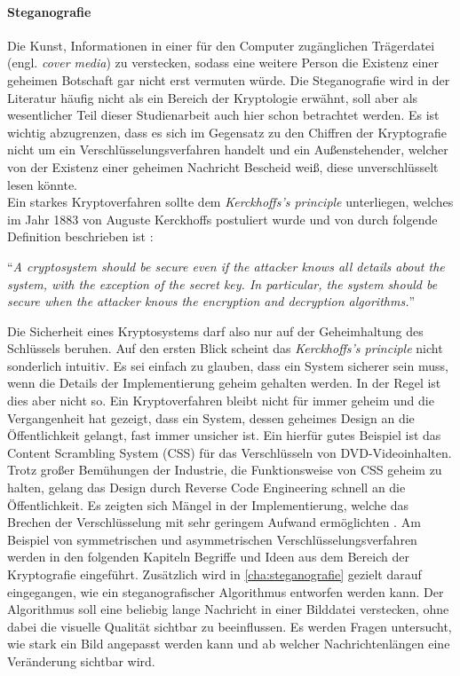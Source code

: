 \paragraph{Steganografie}
Die Kunst, Informationen in einer für den Computer
zugänglichen Trä\-gerdatei (engl. \textit{cover media}) zu verstecken, sodass eine
weitere Person die Existenz einer geheimen Botschaft gar nicht erst vermuten würde.
Die Steganografie wird in der Literatur häufig nicht als ein Bereich der Kryptologie
erwähnt, soll aber als wesentlicher Teil dieser Studienarbeit auch hier
schon betrachtet werden. Es ist wichtig abzugrenzen, dass es sich
im Gegensatz zu den Chiffren der Kryptografie nicht um ein Verschlüsselungsverfahren handelt
und ein Außenstehender, welcher von der Existenz einer geheimen Nachricht Bescheid weiß,
diese unverschlüsselt lesen könnte.\\[8pt]
Ein starkes Kryptoverfahren sollte dem \textit{Kerckhoffs's principle} unterliegen, welches
im Jahr 1883 von Auguste Kerckhoffs postuliert wurde und von \citeauthor{BOOK:crypto}
durch folgende Definition beschrieben ist \parencite*[11]{BOOK:crypto}:

\begin{definition}
  \enquote{\textit{A cryptosystem should be secure even if the attacker knows all details about
      the system, with the exception of the secret key. In particular, the system should be secure when
      the attacker knows the encryption and decryption algorithms.}}
\end{definition}

\noindent
Die Sicherheit eines Kryptosystems darf also nur auf der Geheimhaltung des Schlüssels beruhen.
Auf den ersten Blick scheint das \textit{Kerckhoffs's principle} nicht sonderlich intuitiv.
Es sei einfach zu glauben, dass ein System
sicherer sein muss, wenn die Details der Implementierung geheim gehalten werden.
In der Regel ist dies aber nicht so. Ein Kryptoverfahren bleibt nicht für immer geheim und die
Vergangenheit hat gezeigt, dass ein System, dessen geheimes Design an die Öffentlichkeit
gelangt, fast immer unsicher ist. Ein hierfür gutes Beispiel ist das Content Scrambling System (CSS)
für das Verschlüsseln von DVD-Videoinhalten. Trotz großer Bemühungen der Industrie, die
Funktionsweise von CSS geheim zu halten, gelang das Design durch Reverse Code Engineering
schnell an die Öffentlichkeit. Es zeigten sich Mängel in der Implementierung,
welche das Brechen der Verschlüsselung mit sehr geringem Aufwand ermöglichten \parencite{SITE:CSS}.
Am Beispiel von symmetrischen und asymmetrischen Verschlüsselungsverfahren werden in den
folgenden Kapiteln Begriffe und Ideen aus dem Bereich der Kryptografie eingeführt.
Zusätzlich wird in \autoref{cha:steganografie} gezielt darauf eingegangen,
wie ein steganografischer Algorithmus entworfen werden kann.
Der Algorithmus soll eine beliebig lange Nachricht in einer Bilddatei verstecken,
ohne dabei die visuelle Qualität sichtbar zu beeinflussen. Es werden Fragen untersucht,
wie stark ein Bild angepasst werden kann und ab welcher Nachrichtenlängen
eine Veränderung sichtbar wird.
